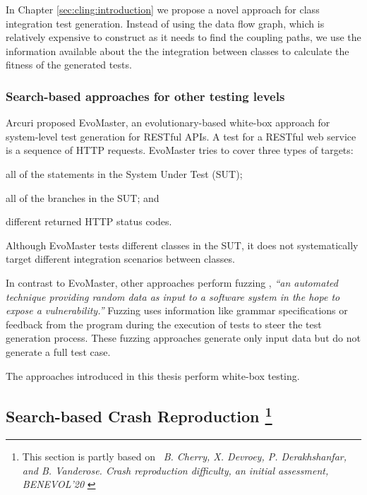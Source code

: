 In Chapter \ref{sec:cling:introduction} we propose a novel approach for class integration test generation.
Instead of using the data flow graph, which is relatively expensive to construct as it needs to find the coupling paths, we use the information available about the the integration between classes to calculate the fitness of the generated tests.
\subsubsection{Search-based approaches for other testing levels}

Arcuri \cite{Arcuri2019} proposed EvoMaster, an evolutionary-based white-box approach for system-level test generation for RESTful APIs. A test for a RESTful web service is a sequence of HTTP requests. EvoMaster tries to cover three types of targets:
 \begin{inparaenum}[(i)]
 \item all of the statements in the System Under Test (SUT);
 \item all of the branches in the SUT; and
\item different returned HTTP status codes.
\end{inparaenum}
Although EvoMaster tests different classes in the SUT, it does not systematically target different integration scenarios between classes.

In contrast to EvoMaster, other approaches perform fuzzing \cite{Holler2012}, \textit{``an automated technique providing random data as input to a software system in the hope to expose a vulnerability.''} Fuzzing uses information like grammar specifications \cite{Holler2012, beyene2012, coppit2005, godefroid2008} or feedback from the program during the execution of tests \cite{Padhye2019} to steer the test generation process.
These fuzzing approaches generate only input data but do not generate a full test case.

The approaches introduced in this thesis perform white-box testing.

\subsection{Search-based Crash Reproduction \protect\footnote{ This section is partly based on \faFileTextO~\emph{B. Cherry, X. Devroey, P. Derakhshanfar, and B. Vanderose. Crash reproduction difficulty, an initial assessment, BENEVOL'20} \cite{Cherry2020a}}}

